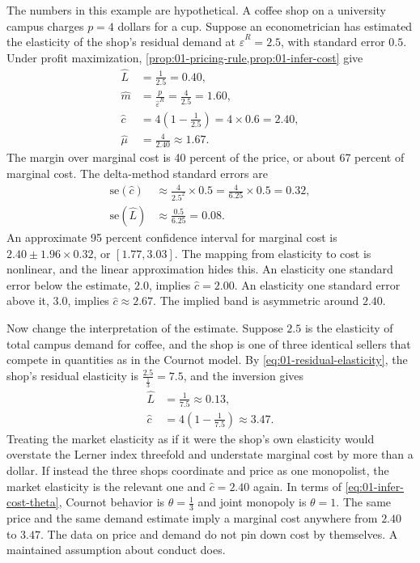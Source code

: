 \begin{example}\label{ex:01-coffee}
The numbers in this example are hypothetical. A coffee shop on a university campus charges $p = 4$ dollars for a
cup. Suppose an econometrician has estimated the elasticity of the shop's residual demand at
$\hat\varepsilon^R = 2.5$, with standard error $0.5$. Under profit maximization,
\cref{prop:01-pricing-rule,prop:01-infer-cost} give
\begin{align*}
  \hat L &= \frac{1}{2.5} = 0.40, \\
  \hat m &= \frac{p}{\hat\varepsilon^R} = \frac{4}{2.5} = 1.60, \\
  \hat c &= 4\left(1 - \frac{1}{2.5}\right) = 4 \times 0.6 = 2.40, \\
  \hat\mu &= \frac{4}{2.40} \approx 1.67 .
\end{align*}
The margin over marginal cost is 40 percent of the price, or about 67 percent of marginal cost. The delta-method
standard errors are
\begin{align*}
  \mathrm{se}(\hat c) &\approx \frac{4}{2.5^2} \times 0.5 = \frac{4}{6.25} \times 0.5 = 0.32, \\
  \mathrm{se}(\hat L) &\approx \frac{0.5}{6.25} = 0.08 .
\end{align*}
An approximate 95 percent confidence interval for marginal cost is $2.40 \pm 1.96 \times 0.32$, or
$[1.77, 3.03]$. The mapping from elasticity to cost is nonlinear, and the linear approximation hides this. An
elasticity one standard error below the estimate, $2.0$, implies $\hat c = 2.00$. An elasticity one standard
error above it, $3.0$, implies $\hat c \approx 2.67$. The implied band is asymmetric around $2.40$.

Now change the interpretation of the estimate. Suppose $2.5$ is the elasticity of total campus demand for
coffee, and the shop is one of three identical sellers that compete in quantities as in the Cournot model. By
\eqref{eq:01-residual-elasticity}, the shop's residual elasticity is $\frac{2.5}{\frac{1}{3}} = 7.5$, and the
inversion gives
\begin{align*}
  \hat L &= \frac{1}{7.5} \approx 0.13, \\
  \hat c &= 4\left(1 - \frac{1}{7.5}\right) \approx 3.47 .
\end{align*}
Treating the market elasticity as if it were the shop's own elasticity would overstate the Lerner index
threefold and understate marginal cost by more than a dollar. If instead the three shops coordinate and price as
one monopolist, the market elasticity is the relevant one and $\hat c = 2.40$ again. In terms of
\eqref{eq:01-infer-cost-theta}, Cournot behavior is $\theta = \frac{1}{3}$ and joint monopoly is $\theta = 1$.
The same price and the same demand estimate imply a marginal cost anywhere from $2.40$ to $3.47$. The data on
price and demand do not pin down cost by themselves. A maintained assumption about conduct does.
\end{example}

